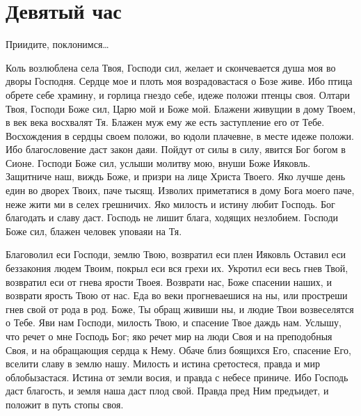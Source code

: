 \section{Девятый час}\begin{mymulticols}



Приидите, поклонимся… 




Коль возлюблена села Твоя, Господи сил, желает и скончевается душа моя во дворы Господня. Сердце мое и плоть моя возрадовастася о Бозе живе. Ибо птица обрете себе храмину, и горлица гнездо себе, идеже положи птенцы своя. Олтари Твоя, Господи Боже сил, Царю мой и Боже мой. Блажени живущии в дому Твоем, в век века восхвалят Тя. Блажен муж ему же есть заступление его от Тебе. Восхождения в сердцы своем положи, во юдоли плачевне, в месте идеже положи. Ибо благословение даст закон даяи. Пойдут от силы в силу, явится Бог богом в Сионе. Господи Боже сил, услыши молитву мою, внуши Боже Ияковль. Защитниче наш, виждь Боже, и призри на лице Христа Твоего. Яко лучше день един во дворех Твоих, паче тысящ. Изволих приметатися в дому Бога моего паче, неже жити ми в селех грешничих. Яко милость и истину любит Господь. Бог благодать и славу даст. Господь не лишит блага, ходящих незлобием. Господи Боже сил, блажен человек уповаяи на Тя.




Благоволил еси Господи, землю Твою, возвратил еси плен Ияковль Оставил еси беззакония людем Твоим, покрыл еси вся грехи их. Укротил еси весь гнев Твой, возвратил еси от гнева ярости Твоея. Возврати нас, Боже спасении наших, и возврати ярость Твою от нас. Еда во веки прогневаешися на ны, или простреши гнев свой от рода в род. Боже, Ты обращ живиши ны, и людие Твои возвеселятся о Тебе. Яви нам Господи, милость Твою, и спасение Твое даждь нам. Услышу, что речет о мне Господь Бог; яко речет мир на люди Своя и на преподобныя Своя, и на обращающия сердца к Нему. Обаче близ боящихся Его, спасение Его, вселити славу в землю нашу. Милость и истина сретостеся, правда и мир облобызастася. Истина от земли восия, и правда с небесе приниче. Ибо Господь даст благость, и земля наша даст плод свой. Правда пред Ним предъидет, и положит в путь стопы своя.





\end{mymulticols}
